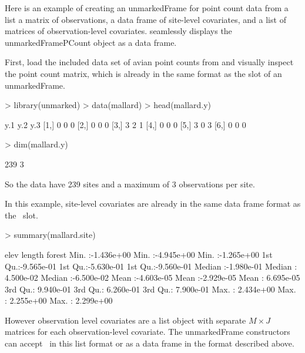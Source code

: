 \documentclass[article,shortnames]{jss}
\newcommand{\scovs}{\code{siteCovs}}
\newcommand{\ocovs}{\code{obsCovs}}
\begin{document}
Here is an example of creating an unmarkedFrame for point count data
from a list a matrix of observations, a data frame of site-level
covariates, and a list of matrices of observation-level covariates.
 seamlessly displays the unmarkedFramePCount object as a
data frame.

First, load the included data set of avian point counts from
\citet{Kery2005} and visually inspect the point count matrix, which is
already in the same format as the  slot of an unmarkedFrame.

\begin{Schunk}
\begin{Sinput}
> library(unmarked)
> data(mallard)
> head(mallard.y)
\end{Sinput}
\begin{Soutput}
     y.1 y.2 y.3
[1,]   0   0   0
[2,]   0   0   0
[3,]   3   2   1
[4,]   0   0   0
[5,]   3   0   3
[6,]   0   0   0
\end{Soutput}
\begin{Sinput}
> dim(mallard.y)
\end{Sinput}
\begin{Soutput}
[1] 239   3
\end{Soutput}
\end{Schunk}

So the data have 239 sites and a maximum of
3 observations per site. 
  
In this example, site-level covariates are already in the same data
frame format as the \scovs\ slot.  

\begin{Schunk}
\begin{Sinput}
> summary(mallard.site)
\end{Sinput}
\begin{Soutput}
      elev                length               forest          
 Min.   :-1.436e+00   Min.   :-4.945e+00   Min.   :-1.265e+00  
 1st Qu.:-9.565e-01   1st Qu.:-5.630e-01   1st Qu.:-9.560e-01  
 Median :-1.980e-01   Median : 4.500e-02   Median :-6.500e-02  
 Mean   :-4.603e-05   Mean   :-2.929e-05   Mean   : 6.695e-05  
 3rd Qu.: 9.940e-01   3rd Qu.: 6.260e-01   3rd Qu.: 7.900e-01  
 Max.   : 2.434e+00   Max.   : 2.255e+00   Max.   : 2.299e+00  
\end{Soutput}
\end{Schunk}


However observation level covariates
are a list object with separate $M \times J$ matrices for each
observation-level covariate.  The unmarkedFrame constructors can
accept \ocovs\ in this list format or as a data frame in the format
described above.
\end{document}
